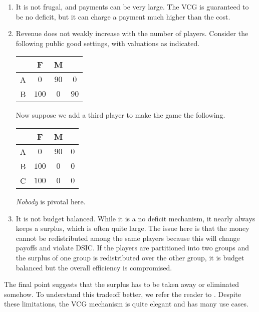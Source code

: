 \begin{enumerate}
			\item It is not frugal, and payments can be very large. The VCG is guaranteed to be no deficit, but it can charge a payment much higher than the cost.
			\item Revenue does not weakly increase with the number of players. Consider the following public good settings, with valuations as indicated.
			\begin{center}
			\begin{tabular}{|c||c|c||c|}
				\hline
				& F & M & \text{payment} \\
				\hline\hline
				A & $0$ & $90$ & $0$ \\
				\hline
				B & $100$ & $0$ & $90$ \\
				\hline
			\end{tabular}
			\end{center}
			Now suppose we add a third player to make the game the following.
			\begin{center}
			\begin{tabular}{|c||c|c||c|}
				\hline
				& F & M & \text{payment} \\
				\hline\hline
				A & $0$ & $90$ & $0$ \\
				\hline
				B & $100$ & $0$ & $0$ \\
				\hline
				C & $100$ & $0$ & $0$ \\ \hline
			\end{tabular}
			\end{center}
			\emph{Nobody} is pivotal here.

			 \item It is not budget balanced. While it is a no deficit mechanism, it nearly always keeps a surplus, which is often quite large. The issue here is that the money cannot be redistributed among the same players because this will change payoffs and violate DSIC. If the players are partitioned into two groups and the surplus of one group is redistributed over the other group, it is budget balanced but the overall efficiency is compromised. 
		\end{enumerate}

		The final point suggests that the surplus has to be taken away or eliminated somehow. To understand this tradeoff better, we refer the reader to \cite{nath-sandholm-2019}. Despite these limitations, the VCG mechanism is quite elegant and has many use cases.